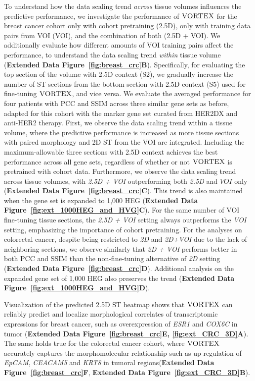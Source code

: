To understand how the data scaling trend \textit{across} tissue volumes influences the predictive performance, we investigate the performance of $\textsc{VORTEX}$ for the breast cancer cohort only with cohort pretraining (2.5D), only with training data pairs from VOI (VOI), and the combination of both (2.5D + VOI). We additionally evaluate how different amounts of VOI training pairs affect the performance, to understand the data scaling trend \textit{within} tissue volume (\textbf{Extended Data Figure~\ref{fig:breast_crc}B}). Specifically, for evaluating the top section of the volume with 2.5D context (S2), we gradually increase the number of ST sections from the bottom section with 2.5D context (S5) used for fine-tuning $\textsc{VORTEX}$, and vice versa. We evaluate the averaged performance for four patients with PCC and SSIM across three similar gene sets as before, adapted for this cohort with the marker gene set curated from HER2DX and anti-HER2 therapy\cite{prat2020multivariable, smith2021her2+}. 
First, we observe the data scaling trend within a tissue volume, where the predictive performance is increased as more tissue sections with paired morphology and 2D ST from the VOI are integrated. Including the maximum-allowable three sections with 2.5D context achieves the best performance across all gene sets, regardless of whether or not $\textsc{VORTEX}$ is pretrained with cohort data.
Furthermore, we observe the data scaling trend across tissue volumes, with \textit{2.5D + VOI} outperforming both \textit{2.5D} and $\textit{VOI}$ only (\textbf{Extended Data Figure~\ref{fig:breast_crc}C}). This trend is also maintained when the gene set is expanded to 1,000 HEG (\textbf{Extended Data Figure~\ref{fig:ext_1000HEG_and_HVG}C}).
For the same number of VOI fine-tuning tissue sections, the \textit{2.5D + VOI} setting always outperforms the \textit{VOI} setting, emphasizing the importance of cohort pretraining.
For the analyses on colorectal cancer, despite being restricted to \textit{2D} and \textit{2D+VOI} due to the lack of neighboring sections, we observe similarly that \textit{2D + VOI} performs better in both PCC and SSIM than the non-fine-tuning alternative of \textit{2D} setting (\textbf{Extended Data Figure~\ref{fig:breast_crc}D}). Additional analysis on the expanded gene set of 1,000 HEG also preserves the trend (\textbf{Extended Data Figure~\ref{fig:ext_1000HEG_and_HVG}D}).

Visualization of the predicted 2.5D ST heatmap shows that $\textsc{VORTEX}$ can reliably predict and localize morphological correlates of transcriptomic expressions for breast cancer, such as overexpression of \textit{ESR1} and \textit{COX6C} \cite{kim2017epithelial} in tumor (\textbf{Extended Data Figure~\ref{fig:breast_crc}E, \ref{fig:ext_CRC_3D}A}). The same holds true for the colorectal cancer cohort, where $\textsc{VORTEX}$ accurately captures the morphomolecular relationship such as up-regulation of \textit{EpCAM}, \textit{CEACAM5} and \textit{KRT8} in tumoral regions\cite{xiao2024integrating}(\textbf{Extended Data Figure~\ref{fig:breast_crc}F}, \textbf{Extended Data Figure~\ref{fig:ext_CRC_3D}B}).

